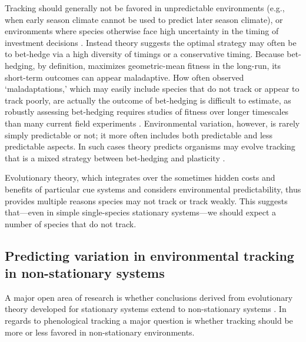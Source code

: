 \documentclass[11pt,letterpaper]{article}
\begin{document}
Tracking should generally not be favored in unpredictable environments (e.g., when early season climate cannot be used to predict later season climate), or environments where species otherwise face high uncertainty in the timing of investment decisions \citep{Gavrilets1993}. Instead theory suggests the optimal strategy may often be to bet-hedge \citep{Venable:2007os,donald2013,decasas2015} via a high diversity of timings or a conservative timing. Because bet-hedging, by definition, maximizes geometric-mean fitness in the long-run, its short-term outcomes can appear maladaptive. How often observed `maladaptations,' which may easily include species that do not track or appear to track poorly, are actually the outcome of bet-hedging is difficult to estimate, as robustly assessing bet-hedging requires studies of fitness over longer timescales than many current field experiments \citep{simons2011}. Environmental variation, however, is rarely simply predictable or not; it more often includes both predictable and less predictable aspects. In such cases theory predicts organisms may evolve tracking that is a mixed strategy between bet-hedging and plasticity \citep{wong2005}. 

Evolutionary theory, which integrates over the sometimes hidden costs and benefits of particular cue systems and considers environmental predictability, thus provides multiple reasons species may not track or track weakly. This suggests that---even in simple single-species stationary systems---we should expect a number of species that do not track.

\subsection{Predicting variation in environmental tracking in non-stationary systems}
A major open area of research is whether conclusions derived from evolutionary theory developed for stationary systems extend to non-stationary systems \citep{chevin2010}. In regards to phenological tracking a major question is whether tracking should be more or less favored in non-stationary environments. 
\end{document}
